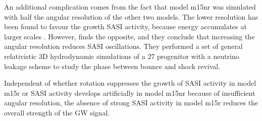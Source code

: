 An additional complication comes from the fact that model m15nr was simulated with half the angular resolution of the other two models. The lower resolution has been found
to favour the growth SASI activity, because energy accumulates at larger scales \citep{hanke_12}.
However, \cite{abdikamalov_15} finds the opposite, and they conclude that increasing the angular resolution reduces SASI oscillations. 
They performed a set of general relativistic 3D hydrodynamic
simulations of a 27 \msun progenitor with a neutrino leakage scheme to study the phase between bounce and
shock revival.

Independent of whether rotation suppresses the growth of SASI activity in model m15r or SASI activity develops
artificially in model m15nr because of insufficient angular resolution, the absence of strong SASI activity in model
m15r reduces the overall strength of the GW signal. 

